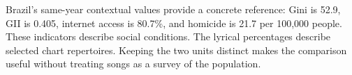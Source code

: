 Brazil's same-year contextual values provide a concrete reference: Gini is 52.9, GII is 0.405, internet access is 80.7\%, and homicide is 21.7 per 100,000 people. These indicators describe social conditions. The lyrical percentages describe selected chart repertoires. Keeping the two units distinct makes the comparison useful without treating songs as a survey of the population.

